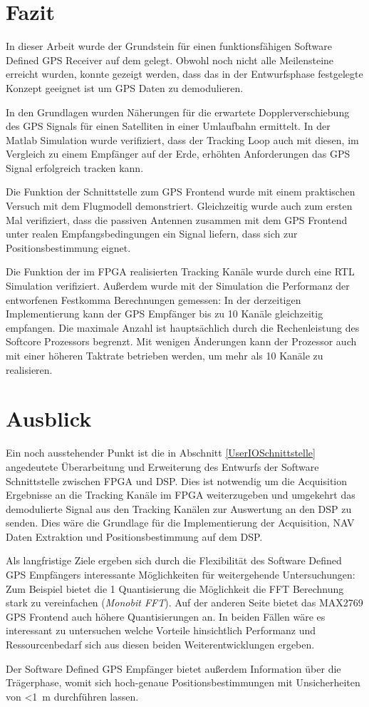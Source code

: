 \section{Fazit}
In dieser Arbeit wurde der Grundstein für einen funktionsfähigen Software Defined GPS Receiver auf dem \dscubesat gelegt. Obwohl noch nicht alle Meilensteine erreicht wurden, konnte gezeigt werden, dass das in der Entwurfsphase festgelegte Konzept geeignet ist um GPS Daten zu demodulieren.

In den Grundlagen wurden Näherungen für die erwartete Dopplerverschiebung des GPS Signals für einen Satelliten in einer Umlaufbahn ermittelt. In der Matlab Simulation wurde verifiziert, dass der Tracking Loop auch mit diesen, im Vergleich zu einem Empfänger auf der Erde, erhöhten Anforderungen das GPS Signal erfolgreich tracken kann.

Die Funktion der Schnittstelle zum GPS Frontend wurde mit einem praktischen Versuch mit dem \dscubesat Flugmodell demonstriert. Gleichzeitig wurde auch zum ersten Mal verifiziert, dass die passiven Antennen zusammen mit dem GPS Frontend unter realen Empfangsbedingungen ein Signal liefern, dass sich zur Positionsbestimmung eignet.

Die Funktion der im FPGA realisierten Tracking Kanäle wurde durch eine \gls{RTL} Simulation verifiziert. Außerdem wurde mit der Simulation die Performanz der entworfenen Festkomma Berechnungen gemessen: In der derzeitigen Implementierung kann der GPS Empfänger bis zu 10 Kanäle gleichzeitig empfangen. Die maximale Anzahl ist hauptsächlich durch die Rechenleistung des Softcore Prozessors begrenzt. Mit wenigen Änderungen kann der Prozessor auch mit einer höheren Taktrate betrieben werden, um mehr als 10 Kanäle zu realisieren.

\section{Ausblick}
Ein noch ausstehender Punkt ist die in Abschnitt \ref{UserIOSchnittstelle} angedeutete Überarbeitung und Erweiterung des Entwurfs der Software Schnittstelle zwischen FPGA und DSP. Dies ist notwendig um die Acquisition Ergebnisse an die Tracking Kanäle im FPGA weiterzugeben und umgekehrt das demodulierte Signal aus den Tracking Kanälen zur Auswertung an den DSP zu senden. Dies wäre die Grundlage für die Implementierung der Acquisition, NAV Daten Extraktion und Positionsbestimmung auf dem DSP. 

Als langfristige Ziele ergeben sich durch die Flexibilität des Software Defined GPS Empfängers interessante Möglichkeiten für weitergehende Untersuchungen: Zum Beispiel bietet die \SI{1}{\bit} Quantisierung die Möglichkeit die FFT Berechnung stark zu vereinfachen (\emph{Monobit FFT}). Auf der anderen Seite bietet das MAX2769 GPS Frontend auch höhere Quantisierungen an. In beiden Fällen wäre es interessant zu untersuchen welche Vorteile hinsichtlich Performanz und Ressourcenbedarf sich aus diesen beiden Weiterentwicklungen ergeben.

Der Software Defined GPS Empfänger bietet außerdem Information über die Trägerphase, womit sich hoch-genaue Positionsbestimmungen mit Unsicherheiten von \SI{<1}{\meter} durchführen lassen.


